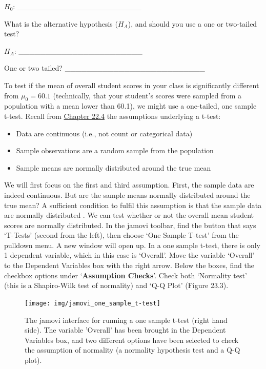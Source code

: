 \documentclass[
]{scrbook}
\providecommand{\tightlist}{%
  \setlength{\itemsep}{0pt}\setlength{\parskip}{0pt}}
\begin{document}
\(H_{0}\): \_\_\_\_\_\_\_\_\_\_\_\_\_\_\_\_\_\_\_\_\_\_\_

What is the alternative hypothesis (\(H_{A}\)), and should you use a one or two-tailed test?

\(H_{A}\): \_\_\_\_\_\_\_\_\_\_\_\_\_\_\_\_\_\_\_\_\_\_\_

One or two tailed? \_\_\_\_\_\_\_\_\_\_\_\_\_\_\_\_\_\_\_\_\_\_\_\_\_\_

To test if the mean of overall student scores in your class is significantly different from \(\mu_{0} = 60.1\) (technically, that your student's scores were sampled from a population with a mean lower than 60.1), we might use a one-tailed, one sample t-test.
Recall from \protect\hyperlink{assumptions-of-t-tests}{Chapter 22.4} the assumptions underlying a t-test:

\begin{itemize}
\tightlist
\item
  Data are continuous (i.e., not count or categorical data)
\item
  Sample observations are a random sample from the population
\item
  Sample means are normally distributed around the true mean
\end{itemize}

We will first focus on the first and third assumption.
First, the sample data are indeed continuous.
But are the sample means normally distributed around the true mean?
A sufficient condition to fulfil this assumption is that the sample data are normally distributed \citep{Johnson1995, Lumley2002}.
We can test whether or not the overall mean student scores are normally distributed.
In the jamovi toolbar, find the button that says `T-Tests' (second from the left), then choose `One Sample T-test' from the pulldown menu.
A new window will open up.
In a one sample t-test, there is only 1 dependent variable, which in this case is `Overall'.
Move the variable `Overall' to the Dependent Variables box with the right arrow.
Below the boxes, find the checkbox options under `\textbf{Assumption Checks}'.
Check both `Normality test' (this is a Shapiro-Wilk test of normality) and `Q-Q Plot' (Figure 23.3).

\begin{figure}
\texttt{[image: img/jamovi\_one\_sample\_t-test]} \caption{The jamovi interface for running a one sample t-test (right hand side). The variable 'Overall' has been brought in the Dependent Variables box, and two different options have been selected to check the assumption of normality (a normality hypothesis test and a Q-Q plot).}\label{fig:unnamed-chunk-103}
\end{figure}
\end{document}
